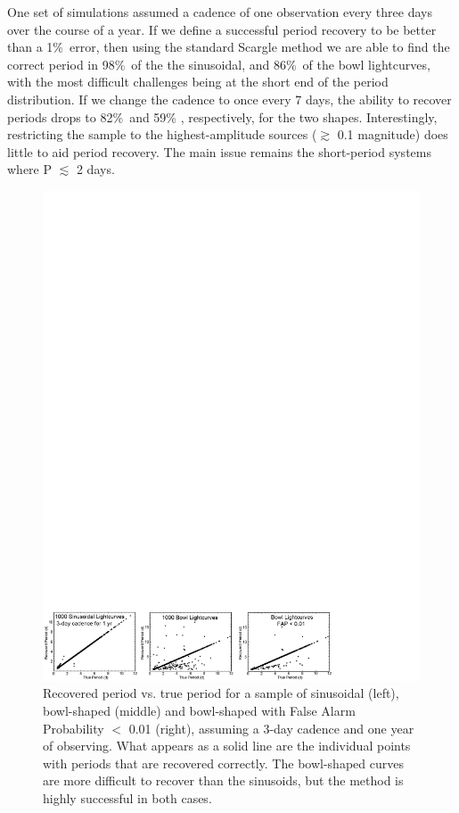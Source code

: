 One set of simulations assumed a cadence of
one observation every three days over the course of a year.
If we define a successful period recovery to be better than a 1\%\ error, then
using the standard Scargle method \citep[(Horne \& Baliunas 1986)]{Scargle}
we are able to find the correct period in
98\%\ of the the sinusoidal, and 86\%\ of the bowl lightcurves, with the most
difficult challenges being at the short end of the period distribution. If we change
the cadence to once every 7 days, the ability to recover periods drops to
82\%\ and 59\% , respectively, for the two shapes. Interestingly, restricting the
sample to the highest-amplitude sources ($\gtrsim$ 0.1 magnitude) does little
to aid period recovery. The main issue remains the short-period systems where
P $\lesssim$ 2 days. 

\begin{figure}[b]
\begin{center}
 \includegraphics[width=5.32in]{figs/starFormation/tts1.pdf}
 \caption{Recovered period vs. true period for a sample of sinusoidal (left),
bowl-shaped (middle) and bowl-shaped with False Alarm Probability $<$ 0.01 (right),
assuming a 3-day cadence and one year of observing. What appears as a solid line are the
individual points with periods that are recovered correctly. The bowl-shaped curves are
more difficult to recover than the sinusoids, but the method is highly successful in both cases.}
   \label{tts1}
\end{center}
\end{figure}

